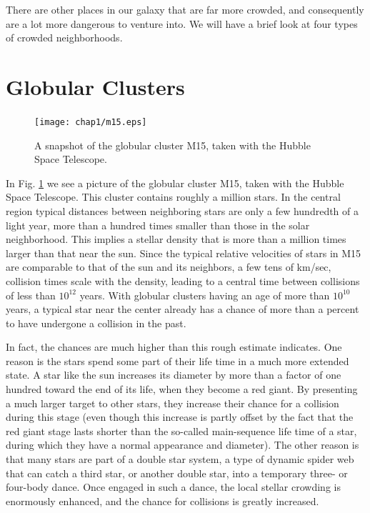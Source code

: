 There are other places in our galaxy that are far more crowded, and
consequently are a lot more dangerous to venture into.  We will have
a brief look at four types of crowded neighborhoods.

\section{Globular Clusters}

\begin{figure}[ht]
\centering
\texttt{[image: chap1/m15.eps]}
\caption[A snapshot of the globular cluster M15]
{A snapshot of the globular cluster M15, taken with the Hubble Space
Telescope.}
\label{fig:m15}
\end{figure}

In Fig. \ref{fig:m15} we see a picture of the globular cluster M15,
taken with the Hubble Space Telescope.  This cluster contains roughly
a million stars.  In the central region typical distances between
neighboring stars are only a few hundredth of a light year, more than
a hundred times smaller than those in the solar neighborhood.  This
implies a stellar density that is more than a million times larger
than that near the sun.  Since the typical relative velocities of
stars in M15 are comparable to that of the sun and its neighbors, a
few tens of km/sec, collision times scale with the density, leading to
a central time between collisions of less than $10^{12}$ years.  With
globular clusters having an age of more than $10^{10}$ years, a typical
star near the center already has a chance of more than a percent to
have undergone a collision in the past.  

In fact, the chances are much higher than this rough estimate indicates.
One reason is the stars spend some part of their life time in a much
more extended state.  A star like the sun increases its diameter by
more than a factor of one hundred toward the end of its life, when
they become a red giant.  By presenting a much larger target to other
stars, they increase their chance for a collision during this stage
(even though this increase is partly offset by the fact that the red
giant stage lasts shorter than the so-called main-sequence life time
of a star, during which they have a normal appearance and diameter).
The other reason is that many stars are part of a double star system,
a type of dynamic spider web that can catch a third star, or another
double star, into a temporary three- or four-body dance.  Once engaged
in such a dance, the local stellar crowding is enormously enhanced,
and the chance for collisions is greatly increased. 

